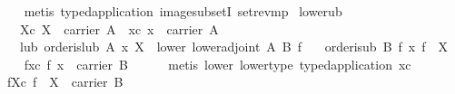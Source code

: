 \begin{isabellebody}
%
\isadelimproof
\ \ %
\endisadelimproof
%
\isatagproof
{}\isamarkupfalse%
\ {}metis\ typed{}application\ image{}subsetI\ set{}rev{}mp{}%
\endisatagproof
{\isafoldproof}%
%
\isadelimproof
\isanewline
%
\endisadelimproof
\isanewline
{}\isamarkupfalse%
\ lower{}ub{}\isanewline
\ \ \ Xc{}\ {}X\ {}\ carrier\ A{}\ \ xc{}\ {}x\ {}\ carrier\ A{}\isanewline
\ \ \ lub{}\ {}order{}is{}lub\ A\ x\ X{}\ \ lower{}\ {}lower{}adjoint\ A\ B\ f{}\isanewline
\ \ \ {}order{}is{}ub\ B\ {}f\ x{}\ {}f\ {}\ X{}{}\isanewline
%
\isadelimproof
%
\endisadelimproof
%
\isatagproof
{}\isamarkupfalse%
\ {}\isanewline
\ \ \isamarkupfalse%
\ fxc{}\ {}f\ x\ {}\ carrier\ B{}\isanewline
\ \ \ \ \isamarkupfalse%
\ {}metis\ lower\ lower{}type\ typed{}application\ xc{}\isanewline
\isanewline
\ \ \isamarkupfalse%
\ fXc{}\ {}f\ {}\ X\ {}\ carrier\ B{}\isanewline

\end{isabellebody}
